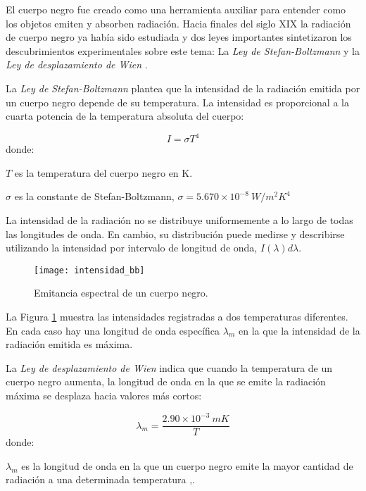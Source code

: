     El cuerpo negro fue creado como una herramienta auxiliar para entender como los objetos emiten y absorben radiación.
    Hacia finales del siglo XIX la radiación de cuerpo negro ya había sido estudiada y dos leyes importantes sintetizaron los descubrimientos experimentales sobre este tema: La \textit{Ley de Stefan-Boltzmann} y la \textit{Ley de desplazamiento de Wien} \cite{FUV3}.
    
    La \textit{Ley de Stefan-Boltzmann} plantea que la intensidad de la radiación emitida por un cuerpo negro depende de su temperatura. La intensidad es proporcional a la cuarta potencia de la temperatura absoluta del cuerpo:
    
    \begin{equation}
        I = \sigma T^{4}
        \label{eq:Stefan-Boltzmann}
    \end{equation}
    donde:
    
    $T$ es la temperatura del cuerpo negro en K.
    
    $\sigma$ es la constante de Stefan-Boltzmann, $\sigma = 5.670\times10^{-8}\ W/m^{2}K^{4}$
    
    La intensidad de la radiación no se distribuye uniformemente a lo largo de todas las longitudes de onda. En cambio, su distribución puede medirse y describirse utilizando la intensidad por intervalo de longitud de onda, $I(\lambda)d\lambda$.
            \begin{figure}[hbtp]
                \centering
                \texttt{[image: intensidad\_bb]}
                \caption{Emitancia espectral de un cuerpo negro.}
                \label{fig:intensidad_bb}
            \end{figure}    
    \newpage
    La Figura \ref{fig:intensidad_bb} muestra las intensidades registradas a dos temperaturas diferentes. En cada caso hay una longitud de onda específica $\lambda_{m}$ en la que la intensidad de la radiación emitida es máxima.
    
    La \textit{Ley de desplazamiento de Wien} indica que cuando la temperatura de un cuerpo negro aumenta, la longitud de onda en la que se emite la radiación máxima se desplaza hacia valores más cortos:
    
    \begin{equation}
        \lambda_{m} = \frac{2.90\times10^{-3}\ mK}{T}
        \label{eq:Wien}
    \end{equation}   
    donde:
    
    $\lambda_{m}$ es la longitud de onda en la que un cuerpo negro emite la mayor cantidad de radiación a una determinada temperatura \cite{Sears},\cite{FUV3}.
    
